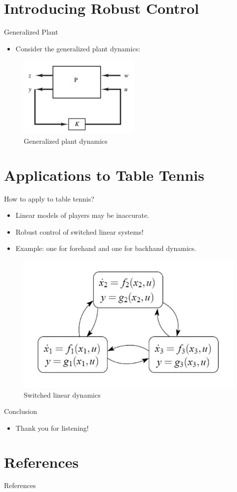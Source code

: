 \documentclass[handout]{beamer}
\begin{document}
\section{Introducing Robust Control}
%
\begin{frame}{Generalized Plant}
\begin{itemize}
\item Consider the generalized plant dynamics:
\end{itemize}
\begin{figure}
  \center
  \includegraphics[scale=1.0]{generalizedPlant.jpg}
  \caption{Generalized plant dynamics}			
\end{figure}
\end{frame}
%
\section{Applications to Table Tennis}
%
\begin{frame}{How to apply to table tennis?}
\begin{itemize}
\item Linear models of players may be inaccurate.
\item Robust control of switched linear systems!
\item Example: one for forehand and one for backhand dynamics.
\end{itemize}
\begin{figure}
  \center
  \includegraphics[scale=0.5]{hybridSystem.jpg}
  \caption{Switched linear dynamics}			
\end{figure}
\end{frame}
%
\begin{frame}{Conclusion}
\begin{itemize}
\item Thank you for listening!
\end{itemize}
\end{frame}	
%
\section{References}
\begin{frame}[allowframebreaks]{References}
\def\newblock{\hskip .11em plus .33em minus .07em}

\end{frame}
%

%
\end{document}
